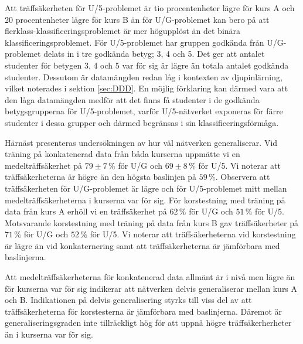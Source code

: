 Att träffsäkerheten för U/5-problemet är tio procentenheter lägre för kurs A och 20 procentenheter lägre för kurs B än för U/G-problemet kan bero på att flerklass-klassificeringsproblemet är mer högupplöst än det binära klassificeringsproblemet. För U/5-problemet har gruppen godkända från U/G-problemet delats in i tre godkända betyg; 3, 4 och 5. Det ger att antalet studenter för betygen 3, 4 och 5 var för sig är lägre än totala antalet godkända studenter. Dessutom är datamängden redan låg i kontexten av djupinlärning, vilket noterades i sektion \ref{sec:DDD}. En möjlig förklaring kan därmed vara att den låga datamängden medför att det finns få studenter i de godkända betygsgrupperna för U/5-problemet, varför U/5-nätverket exponeras för färre studenter i dessa grupper och därmed begränsas i sin klassificeringsförmåga.

Härnäst presenteras undersökningen av hur väl nätverken generaliserar. Vid träning på konkatenerad data från båda kurserna uppmätte vi en medelträffsäkerhet på $79\pm7\, \%$ för U/G och $69\pm8 \, \% $ för U/5. Vi noterar att träffsäkerheterna är högre än den högsta baslinjen på $59 \, \%$. Observera att träffsäkerheten för U/G-problemet är lägre och för U/5-problemet mitt mellan medelträffsäkerheterna i kurserna var för sig. För korstestning med träning på data från kurs A erhöll vi en träffsäkerhet på $62 \, \% $ för U/G och $51 \, \%$ för U/5. Motsvarande korstestning med träning på data från kurs B gav träffsäkerheter på $71\, \%$ för U/G och $52 \, \%$ för U/5. Vi noterar att träffsäkerheterna vid korstestning är lägre än vid konkaternering samt att träffsäkerheterna är jämförbara med baslinjerna.

Att medelträffsäkerheterna för konkatenerad data allmänt är i nivå men lägre än för kurserna var för sig indikerar att nätverken delvis generaliserar mellan kurs A och B. Indikationen på delvis generalisering styrks till viss del av att träffsäkerheterna för korstesterna är jämförbara med baslinjerna. Däremot är generaliseringsgraden inte tillräckligt hög för att uppnå högre träffsäkerherheter än i kurserna var för sig. 




